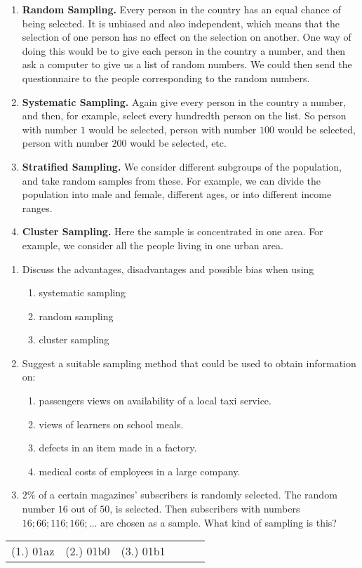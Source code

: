 \begin{enumerate}
\item[] \textbf{Random Sampling.} Every person in the country has an equal chance of being selected. It is unbiased and also independent, which means that the selection of one person has no effect on the selection on another. One way of doing this would be to give each person in the country a number, and then ask a computer to give us a list of random numbers. We could then send the questionnaire to the people corresponding to the random numbers.
\item[]  \textbf{Systematic Sampling.} Again give every person in the country a number, and then, for example, select every hundredth person on the list. So person with number $1$ would be selected, person with number $100$ would be selected, person with number $200$ would be selected, etc.
\item[] \textbf{Stratified Sampling.} We consider different subgroups of the population, and take random samples from these. For example, we can divide the population into male and female, different ages, or into different income ranges. 
\item[] \textbf{Cluster Sampling.} Here the sample is concentrated in one area. For example, we consider all the people living in one urban area.
\end{enumerate}

{
\begin{enumerate}
\item Discuss the advantages, disadvantages and possible bias when using
\begin{enumerate}
\item systematic sampling
\item random sampling
\item cluster sampling
\end{enumerate}
\item Suggest a suitable sampling method that could be used to obtain information on:
\begin{enumerate}
\item passengers views on availability of a local taxi service.
\item views of learners on school meals.
\item defects in an item made in a factory.
\item medical costs of employees in a large company.
\end{enumerate}
\item $2\%$ of a certain magazines' subscribers is randomly selected. The random number $16$ out of $50$, is selected. Then subscribers with numbers $16; 66; 116; 166; \ldots$ are chosen as a sample. What kind of sampling is this?
\end{enumerate}

\par \practiceinfo
\par \begin{tabular}[h]{cccccc}
(1.)	01az	&
(2.)	01b0	&
(3.)	01b1	&
\end{tabular}}

